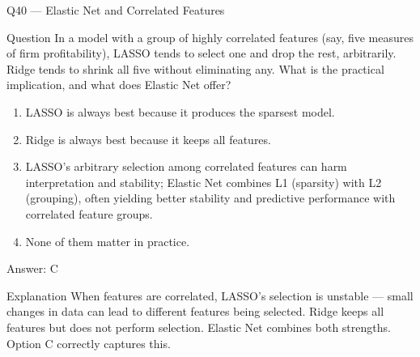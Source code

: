 \documentclass[aspectratio=169,8pt]{beamer}
\begin{document}
	\begin{frame}{Q40 --- Elastic Net and Correlated Features}
		\begin{block}{Question}
			In a model with a group of highly correlated features (say, five measures of firm profitability), LASSO tends to select one and drop the rest, arbitrarily. Ridge tends to shrink all five without eliminating any. What is the practical implication, and what does Elastic Net offer?
		\end{block}
		\begin{enumerate}
			\item LASSO is always best because it produces the sparsest model.
			\item Ridge is always best because it keeps all features.
			\item LASSO's arbitrary selection among correlated features can harm interpretation and stability; Elastic Net combines L1 (sparsity) with L2 (grouping), often yielding better stability and predictive performance with correlated feature groups.
			\item None of them matter in practice.
		\end{enumerate}
		\begin{exampleblock}{Answer: C}\end{exampleblock}
		\begin{block}{Explanation}
			When features are correlated, LASSO's selection is unstable --- small changes in data can lead to different features being selected. Ridge keeps all features but does not perform selection. Elastic Net combines both strengths. Option C correctly captures this.
		\end{block}
	\end{frame}
	
\end{document}
